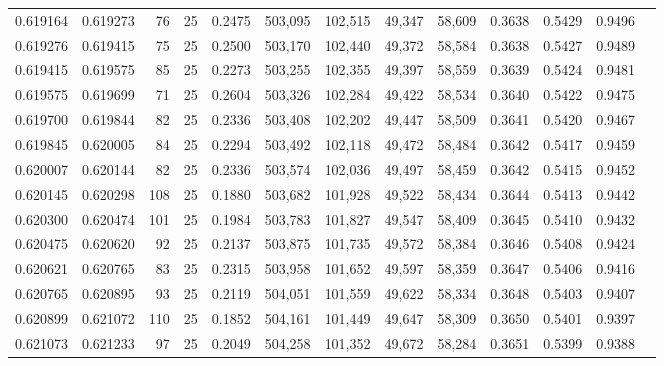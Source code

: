 \begin{tabular}{rrrrrrrrrrrrr}
0.619164 & 0.619273 &    76 &  25 &                                     0.2475 & 503,095 & 102,515 &  49,347 &  58,609 & 0.3638 & 0.5429 & 0.9496 \\
0.619276 & 0.619415 &    75 &  25 &                                     0.2500 & 503,170 & 102,440 &  49,372 &  58,584 & 0.3638 & 0.5427 & 0.9489 \\
0.619415 & 0.619575 &    85 &  25 &                                     0.2273 & 503,255 & 102,355 &  49,397 &  58,559 & 0.3639 & 0.5424 & 0.9481 \\
0.619575 & 0.619699 &    71 &  25 &                                     0.2604 & 503,326 & 102,284 &  49,422 &  58,534 & 0.3640 & 0.5422 & 0.9475 \\
0.619700 & 0.619844 &    82 &  25 &                                     0.2336 & 503,408 & 102,202 &  49,447 &  58,509 & 0.3641 & 0.5420 & 0.9467 \\
0.619845 & 0.620005 &    84 &  25 &                                     0.2294 & 503,492 & 102,118 &  49,472 &  58,484 & 0.3642 & 0.5417 & 0.9459 \\
0.620007 & 0.620144 &    82 &  25 &                                     0.2336 & 503,574 & 102,036 &  49,497 &  58,459 & 0.3642 & 0.5415 & 0.9452 \\
0.620145 & 0.620298 &   108 &  25 &                                     0.1880 & 503,682 & 101,928 &  49,522 &  58,434 & 0.3644 & 0.5413 & 0.9442 \\
0.620300 & 0.620474 &   101 &  25 &                                     0.1984 & 503,783 & 101,827 &  49,547 &  58,409 & 0.3645 & 0.5410 & 0.9432 \\
0.620475 & 0.620620 &    92 &  25 &                                     0.2137 & 503,875 & 101,735 &  49,572 &  58,384 & 0.3646 & 0.5408 & 0.9424 \\
0.620621 & 0.620765 &    83 &  25 &                                     0.2315 & 503,958 & 101,652 &  49,597 &  58,359 & 0.3647 & 0.5406 & 0.9416 \\
0.620765 & 0.620895 &    93 &  25 &                                     0.2119 & 504,051 & 101,559 &  49,622 &  58,334 & 0.3648 & 0.5403 & 0.9407 \\
0.620899 & 0.621072 &   110 &  25 &                                     0.1852 & 504,161 & 101,449 &  49,647 &  58,309 & 0.3650 & 0.5401 & 0.9397 \\
0.621073 & 0.621233 &    97 &  25 &                                     0.2049 & 504,258 & 101,352 &  49,672 &  58,284 & 0.3651 & 0.5399 & 0.9388 \\

\end{tabular}
